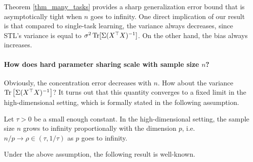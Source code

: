 Theorem \ref{thm_many_tasks} provides a sharp generalization error bound that is asymptotically tight when $n$ goes to infinity.
One direct implication of our result is that compared to single-task learning, the variance always decreases, since STL's variance is equal to $\sigma^2 \operatorname{Tr}[\Sigma (X^{\top} X)^{-1}]$.
On the other hand, the bias always increases.


\paragraph{How does hard parameter sharing scale with sample size $n$?}
Obviously, the concentration error decreases with $n$.
How about the variance $\operatorname{Tr}\left[\Sigma (X^{\top} X)^{-1}\right]$?
It turns out that this quantity converges to a fixed limit in the high-dimensional setting, which is formally stated in the following assumption.

\begin{assumption}\label{assume_rm}
	Let $\tau > 0$ be a small enough constant.
	In the high-dimensional setting,
  the sample size $n$ grows to infinity proportionally with the dimension $p$, i.e. $n / p \rightarrow \rho \in (\tau, 1/\tau)$ as $p$ goes to infinity.
\end{assumption}
Under the above assumption, the following result is well-known.

